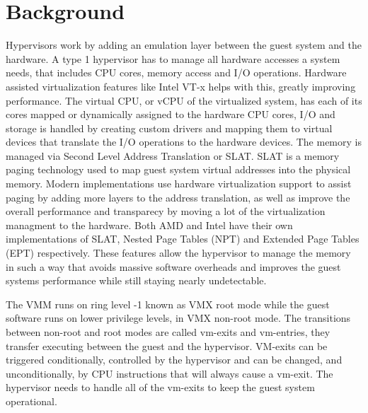 \section{Background}\label{s:background}



Hypervisors work by adding an emulation layer between the guest system and the hardware. A type 1 hypervisor has to manage all hardware accesses a system needs, 
that includes CPU cores, memory access and I/O operations. Hardware assisted virtualization features like Intel VT-x helps with this, greatly improving performance. 
The virtual CPU, or vCPU of the virtualized system, has each of its cores mapped or dynamically assigned to the hardware CPU cores, 
I/O and storage is handled by creating custom drivers and mapping them to virtual devices that translate the I/O operations to the hardware devices. 
The memory is managed via Second Level Address Translation or SLAT. SLAT is a memory paging technology used to map guest system virtual addresses 
into the physical memory. Modern implementations use hardware virtualization support to assist paging by adding more layers to the address translation, as well as 
improve the overall performance and transparecy by moving a lot of the virtualization managment to the hardware. 
Both AMD and Intel have their own implementations of SLAT, Nested Page Tables (NPT) and Extended Page Tables (EPT) respectively.
These features allow the hypervisor to manage the memory in such a way that avoids massive software overheads and improves the guest systems performance 
while still staying nearly undetectable. 

The VMM runs on ring level -1 known as VMX root mode while the guest software runs on lower privilege levels, 
in VMX non-root mode. The transitions between non-root and root modes are called vm-exits and vm-entries, they transfer executing between the guest and the hypervisor. 
VM-exits can be triggered conditionally, controlled by the hypervisor and can be changed, and unconditionally, by CPU instructions that will always cause a vm-exit. 
The hypervisor needs to handle all of the vm-exits to keep the guest system operational.


